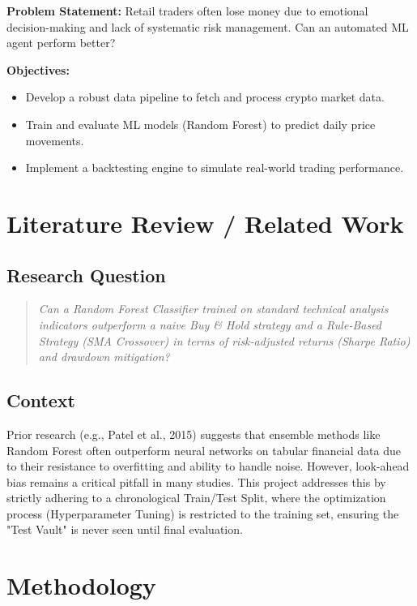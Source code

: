 \documentclass[11pt,a4paper]{article}
\begin{document}
\textbf{Problem Statement:} Retail traders often lose money due to emotional decision-making and lack of systematic risk management. Can an automated ML agent perform better?

\textbf{Objectives:}
\begin{itemize}
    \item Develop a robust data pipeline to fetch and process crypto market data.
    \item Train and evaluate ML models (Random Forest) to predict daily price movements.
    \item Implement a backtesting engine to simulate real-world trading performance.
\end{itemize}

\section{Literature Review / Related Work}
\label{sec:literature}

\subsection{Research Question}
\begin{quote}
\textit{Can a Random Forest Classifier trained on standard technical analysis indicators outperform a naive Buy \& Hold strategy and a Rule-Based Strategy (SMA Crossover) in terms of risk-adjusted returns (Sharpe Ratio) and drawdown mitigation?}
\end{quote}

\subsection{Context}
Prior research (e.g., Patel et al., 2015) suggests that ensemble methods like Random Forest often outperform neural networks on tabular financial data due to their resistance to overfitting and ability to handle noise. However, look-ahead bias remains a critical pitfall in many studies. This project addresses this by strictly adhering to a chronological Train/Test Split, where the optimization process (Hyperparameter Tuning) is restricted to the training set, ensuring the "Test Vault" is never seen until final evaluation.

\section{Methodology}
\label{sec:methodology}
\end{document}
